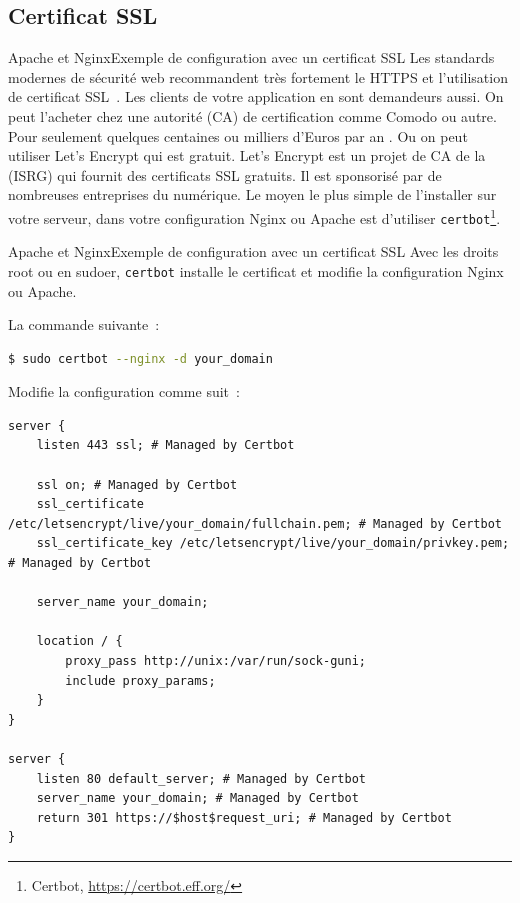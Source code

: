 \documentclass{beamer}
\begin{document}
    \subsection{Certificat SSL}\label{subsec:certificat-ssl}
    \begin{frame}{Apache et Nginx}{Exemple de configuration avec un certificat SSL}
        Les standards modernes de sécurité web recommandent très fortement le HTTPS et l'utilisation de certificat SSL~.
        Les clients de votre application en sont demandeurs aussi.
        \bigbreak
        On peut l'acheter chez une autorité (CA) de certification comme Comodo ou autre.
        Pour seulement quelques centaines ou milliers d'Euros par an .
        Ou on peut utiliser Let's Encrypt qui est gratuit.
        \bigbreak
        Let's Encrypt est un projet de CA de la  (ISRG) qui fournit des certificats SSL gratuits.
        Il est sponsorisé par de nombreuses entreprises du numérique.
        \bigbreak
        Le moyen le plus simple de l'installer sur votre serveur, dans votre configuration Nginx ou Apache est d'utiliser \lstinline{certbot}\footnote{Certbot, \url{https://certbot.eff.org/}}.
    \end{frame}

    \begin{frame}[fragile]{Apache et Nginx}{Exemple de configuration avec un certificat SSL}
        Avec les droits root ou en sudoer, \lstinline{certbot} installe le certificat et modifie la configuration Nginx ou Apache.

        La commande suivante~:
        \begin{lstlisting}[language=bash,basicstyle=\ttfamily\tiny]
$ sudo certbot --nginx -d your_domain
        \end{lstlisting}
        Modifie la configuration comme suit~:
        \begin{lstlisting}[basicstyle=\ttfamily\tiny]
server {
    listen 443 ssl; # Managed by Certbot

    ssl on; # Managed by Certbot
    ssl_certificate     /etc/letsencrypt/live/your_domain/fullchain.pem; # Managed by Certbot
    ssl_certificate_key /etc/letsencrypt/live/your_domain/privkey.pem; # Managed by Certbot

    server_name your_domain;

    location / {
        proxy_pass http://unix:/var/run/sock-guni;
        include proxy_params;
    }
}

server {
    listen 80 default_server; # Managed by Certbot
    server_name your_domain; # Managed by Certbot
    return 301 https://$host$request_uri; # Managed by Certbot
}
        \end{lstlisting}
    \end{frame}
\end{document}
